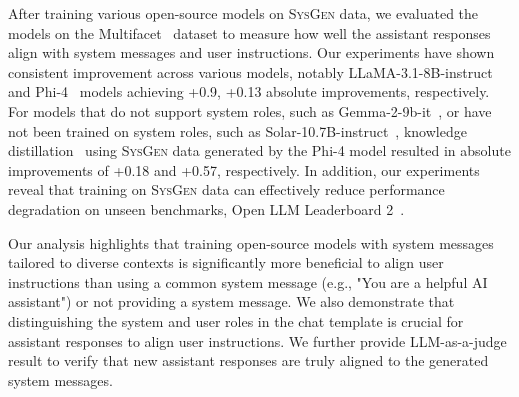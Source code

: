 After training various open-source models on \textsc{SysGen} data, we evaluated the models on the Multifacet~\citep{lee2024aligning} dataset to measure how well the assistant responses align with system messages and user instructions.
Our experiments have shown consistent improvement across various models, notably LLaMA-3.1-8B-instruct~\citep{meta2024introducing} and Phi-4~\citep{abdin2024phi} models achieving +0.9, +0.13 absolute improvements, respectively.
For models that do not support system roles, such as Gemma-2-9b-it~\citep{team2024gemma}, or have not been trained on system roles, such as Solar-10.7B-instruct~\citep{kim-etal-2024-solar}, knowledge distillation~\citep{hinton2015distilling} using \textsc{SysGen} data generated by the Phi-4 model resulted in absolute improvements of +0.18 and +0.57, respectively.
In addition, our experiments reveal that training on \textsc{SysGen} data can effectively reduce performance degradation on unseen benchmarks, Open LLM Leaderboard 2~\citep{myrzakhan2024open}.

Our analysis highlights that training open-source models with system messages tailored to diverse contexts is significantly more beneficial to align user instructions than using a common system message (e.g., "You are a helpful AI assistant") or not providing a system message.
We also demonstrate that distinguishing the system and user roles in the chat template is crucial for assistant responses to align user instructions.
We further provide LLM-as-a-judge result to verify that new assistant responses are truly aligned to the generated system messages.



